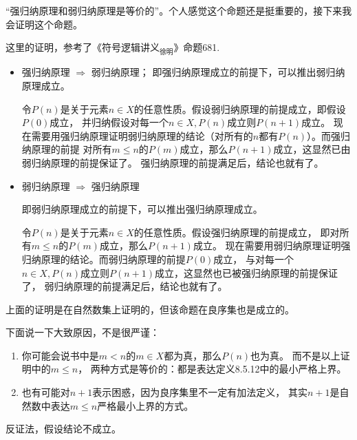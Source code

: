 \documentclass{article}
\begin{document}
\begin{zremark}
  “强归纳原理和弱归纳原理是等价的”。个人感觉这个命题还是挺重要的，接下来我会证明这个命题。

  这里的证明，参考了《符号逻辑讲义$_\text{徐明}$》命题681.
  \begin{itemize}
    \item 强归纳原理 $\Rightarrow$ 弱归纳原理；
          即强归纳原理成立的前提下，可以推出弱归纳原理成立。

          令$P(n)$是关于元素$n \in X$的任意性质。假设弱归纳原理的前提成立，即假设$P(0)$成立，
          并归纳假设对每一个$n \in X, P(n)$成立则$P(n+1)$成立。
          现在需要用强归纳原理证明弱归纳原理的结论（对所有的$n$都有$P(n)$）。而强归纳原理的前提
          对所有$m \leq n$的$P(m)$成立，那么$P(n+1)$成立，这显然已由弱归纳原理的前提保证了。
          强归纳原理的前提满足后，结论也就有了。


    \item 弱归纳原理 $\Rightarrow$ 强归纳原理

          即弱归纳原理成立的前提下，可以推出强归纳原理成立。

          令$P(n)$是关于元素$n \in X$的任意性质。假设强归纳原理的前提成立，
          即对所有$m \leq n$的$P(m)$成立，那么$P(n+1)$成立。
          现在需要用弱归纳原理证明强归纳原理的结论。而弱归纳原理的前提$P(0)$成立，
          与对每一个$n \in X, P(n)$成立则$P(n+1)$成立，这显然也已被强归纳原理的前提保证了，
          弱归纳原理的前提满足后，结论也就有了。
  \end{itemize}
  上面的证明是在自然数集上证明的，但该命题在良序集也是成立的。

  下面说一下大致原因，不是很严谨：

  \begin{enumerate}
    \item 你可能会说书中是$m < n$的$m \in X$都为真，那么$P(n)$也为真。
          而不是以上证明中的$m \leq n$，
          两种方式是等价的：都是表达定义8.5.12中的最小严格上界。
    \item 也有可能对$n + 1$表示困惑，因为良序集里不一定有加法定义，
          其实$n + 1$是自然数中表达$m \leq n$严格最小上界的方式。
  \end{enumerate}

\end{zremark}

反证法，假设结论不成立。

\end{document}
